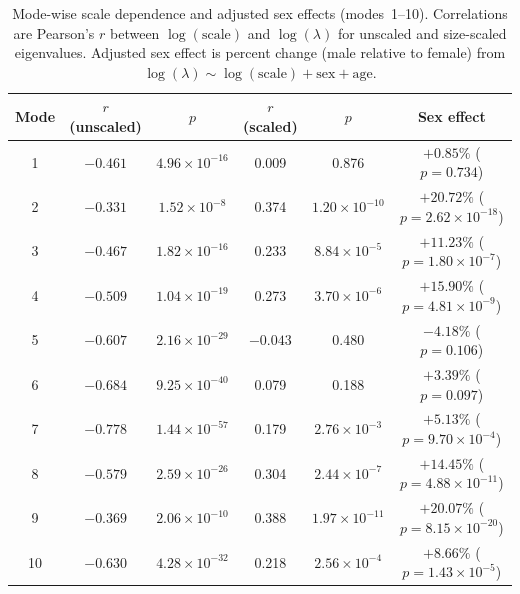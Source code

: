\documentclass[openacc]{rsproca_new}
\begin{document}
\begin{table}[p]
\centering
\caption{Mode-wise scale dependence and adjusted sex effects (modes~1--10). Correlations are Pearson's $r$ between $\log(\mathrm{scale})$ and $\log(\lambda)$ for unscaled and size-scaled eigenvalues. Adjusted sex effect is percent change (male relative to female) from $\log(\lambda) \sim \log(\mathrm{scale}) + \mathrm{sex} + \mathrm{age}$.}
\label{tab:modes}
\begin{tabular}{cccccc}
\toprule
Mode & $r$ (unscaled) & $p$ & $r$ (scaled) & $p$ & Sex effect \\
\midrule
1 & $-0.461$ & $4.96 \times 10^{-16}$ & 0.009 & 0.876 & $+0.85\%$ ($p=0.734$) \\
2 & $-0.331$ & $1.52 \times 10^{-8}$ & 0.374 & $1.20 \times 10^{-10}$ & $+20.72\%$ ($p=2.62 \times 10^{-18}$) \\
3 & $-0.467$ & $1.82 \times 10^{-16}$ & 0.233 & $8.84 \times 10^{-5}$ & $+11.23\%$ ($p=1.80 \times 10^{-7}$) \\
4 & $-0.509$ & $1.04 \times 10^{-19}$ & 0.273 & $3.70 \times 10^{-6}$ & $+15.90\%$ ($p=4.81 \times 10^{-9}$) \\
5 & $-0.607$ & $2.16 \times 10^{-29}$ & $-0.043$ & 0.480 & $-4.18\%$ ($p=0.106$) \\
6 & $-0.684$ & $9.25 \times 10^{-40}$ & 0.079 & 0.188 & $+3.39\%$ ($p=0.097$) \\
7 & $-0.778$ & $1.44 \times 10^{-57}$ & 0.179 & $2.76 \times 10^{-3}$ & $+5.13\%$ ($p=9.70 \times 10^{-4}$) \\
8 & $-0.579$ & $2.59 \times 10^{-26}$ & 0.304 & $2.44 \times 10^{-7}$ & $+14.45\%$ ($p=4.88 \times 10^{-11}$) \\
9 & $-0.369$ & $2.06 \times 10^{-10}$ & 0.388 & $1.97 \times 10^{-11}$ & $+20.07\%$ ($p=8.15 \times 10^{-20}$) \\
10 & $-0.630$ & $4.28 \times 10^{-32}$ & 0.218 & $2.56 \times 10^{-4}$ & $+8.66\%$ ($p=1.43 \times 10^{-5}$) \\
\bottomrule
\end{tabular}
\end{table}
\end{document}
